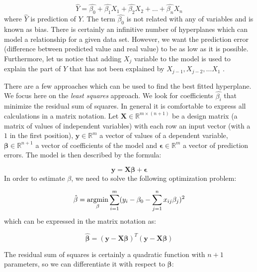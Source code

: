 \begin{equation}\label{eq:LR1}
    \hat{Y} = \hat{\beta_0} + \hat{\beta_1}X_{1} + \hat{\beta_2}X_{2} + \dots + \hat{\beta_n}X_{n}
\end{equation}
where $\hat{Y}$ is prediction of $Y$. The term $\hat{\beta_0}$ is not related with any of variables and is known as bias. 
There is certainly an infinitive number of hyperplanes which can model a relationship for a given data set. However, we want the prediction error (difference between predicted value and real value) to be as low as it is possible. Furthermore, let us notice that adding $X_j$ variable to the model is used to explain the part of $Y$ that has not been explained by $X_{j-1}, X_{j-2}, \ldots X_1$ \citep{Weisberg}.

There are a few approaches which can be used to find the best fitted hyperplane. We focus here on the \textit{least squares} approach. We look for coefficients $\hat{\beta_i}$ that minimize the residual sum of squares. In general it is comfortable to express all calculations in a matrix notation. Let $\boldsymbol{X} \in \mathbb{R}^{m \times (n+1)}$ be a design matrix (a matrix of values of independent variables) with each row an input vector (with a $1$ in the first position), $\boldsymbol{y} \in \mathbb{R}^{m}$ a vector of values of a dependent variable, $\boldsymbol{\beta} \in \mathbb{R}^{n+1}$ a vector of coefficients of the model and $\boldsymbol{\epsilon} \in \mathbb{R}^{m}$ a vector of prediction errors. The model is then described by the formula:

\begin{equation}\label{eq:LR1}
    \boldsymbol{y} = \boldsymbol{X}\boldsymbol{\beta} + \boldsymbol{\epsilon} 
\end{equation}
In order to estimate $\beta$, we need to solve the following optimization problem:

\begin{equation}\label{eq:LR2}
    \hat{\beta} = \operatorname*{argmin}_{\beta}\sum\limits_{i=1}^{m}(y_{i}-\beta_{0}-\sum\limits_{j=1}^{n}x_{ij}\beta_j)^2
\end{equation}
which can be expressed in the matrix notation as:

\begin{equation}\label{eq:LR3}
    \boldsymbol{\hat{\beta}} = (\boldsymbol{y}-\boldsymbol{X}\boldsymbol{\beta})^T(\boldsymbol{y}-\boldsymbol{X}\boldsymbol{\beta})
\end{equation}

The residual sum of squares is certainly a quadratic function with $n+1$ parameters, so we can differentiate it with respect to $\boldsymbol{\beta}$:

